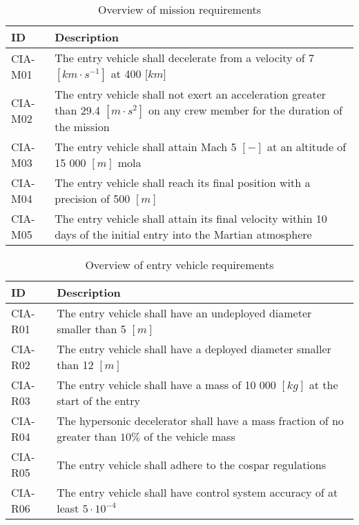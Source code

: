 \begin{table}[h]
	\caption{Overview of mission requirements}
	\label{tab:misreq} 
	\begin{tabular}{|p{}|p{}|}
    \hline
    \textbf{ID}          & \textbf{Description}                                                                                                      \\ \hline \hline
    CIA-M01& The entry vehicle shall decelerate from a velocity of 7 $[km\cdot s ^{-1}]$ at 400 [$km$]  \\ \hline
    CIA-M02 & The entry vehicle shall not exert an acceleration greater than 29.4 $[m \cdot s^{2}]$ on any crew member for the duration of the mission			\\ \hline
    	CIA-M03 & The entry vehicle shall attain Mach 5 $[-]$ at an altitude of 15 000 $[m]$  \gls{mola} \\ \hline
    	CIA-M04 & The entry vehicle shall reach its final position with a precision of 500 $[m]$\\ \hline
    	CIA-M05 & The entry vehicle shall attain its final velocity within 10 days of the initial entry into the Martian atmosphere \\ \hline
    \end{tabular}
\end{table}

\begin{table}[h]
	\caption{Overview of entry vehicle requirements} 
	\label{tab:vehreq}
	\begin{tabular}{|p{}|p{}|}
	    \hline
	    \textbf{ID}          & \textbf{Description}                                                                                                     \\ \hline \hline
	CIA-R01 & The entry vehicle shall have an undeployed diameter smaller than 5 $[m]$                         				            \\ \hline
	CIA-R02 & The entry vehicle shall have a deployed diameter smaller than 12 $[m]$                         				            \\ \hline	
	CIA-R03 & The entry vehicle shall have a mass of 10 000 $[kg]$ at the start of the entry                       				            \\ \hline
	CIA-R04 & The hypersonic decelerator shall have a mass fraction of no greater than $10\%$ of the vehicle mass  \\ \hline
	CIA-R05 &  The entry vehicle shall adhere to the \gls{cospar} regulations \\ \hline
	CIA-R06 &  The entry vehicle shall have control system accuracy of at least $5\cdot 10^{-4}$  \\ \hline
    \end{tabular}
\end{table}